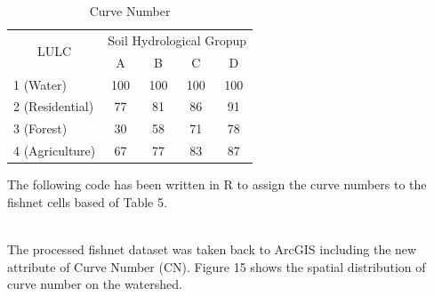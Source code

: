 \documentclass[letterpaper,12pt]{article}
\begin{document}
\begin{enumerate}
\begin{table}[H]
	\centering
	\caption{Curve Number}
	\begin{tabular}{|l|c|c|c|c|}
		\hline
		\multicolumn{1}{|c|}{\multirow{2}{*}{LULC}} & \multicolumn{4}{c|}{Soil Hydrological Gropup} \\ \cline{2-5} 
		\multicolumn{1}{|c|}{}                      & A         & B         & C         & D         \\ \hline
		1 (Water)                                   & 100       & 100       & 100       & 100       \\ \hline
		2 (Residential)                             & 77        & 81        & 86        & 91        \\ \hline
		3 (Forest)                                  & 30        & 58        & 71        & 78        \\ \hline
		4 (Agriculture)                             & 67        & 77        & 83        & 87        \\ \hline
	\end{tabular}
\end{table}


\lstset{style=mystyle}


	The following code has been written in R to assign the curve numbers to the fishnet cells based of Table 5.\\
	
	~

	The processed fishnet dataset was taken back to ArcGIS including the new attribute of Curve Number (CN). Figure 15 shows the spatial distribution of curve number on the watershed.\\
	

\end{enumerate}
\end{document}
